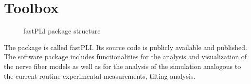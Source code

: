 \section{Toolbox}
%
\begin{figure}[!ht]
\centering
\caption[\acs{fastPLI}]{\ac{fastPLI} package structure}
\label{fig:fastpli}
\end{figure}
%
The \python{} package is called \ac{fastPLI}.
Its source code is publicly available and \cite{fastpli,Matuschke2021} published.
The software package includes functionalities for the analysis and visualization of the nerve fiber models as well as for the analysis of the simulation analogous to the current routine experimental measurements, \eg{} tilting analysis.
%
%
%
